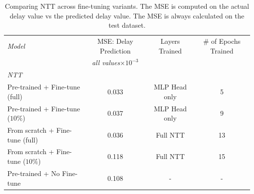 \begin{table}[htbp]
\centering
\begin{tabular}{ l   c   c  c }
\toprule
\emph{Model} &  MSE: Delay Prediction    & Layers Trained  & 	\# of Epochs Trained\\
			&		\emph{all values$\times10^{-3}$} 	&   	& \\ 
			

\midrule
\em{NTT}                                                               &                                             &   &  \\
    \smallindent Pre-trained  +   Fine-tune (full)                                  & 0.033                             & MLP Head only        & 5\\
    \smallindent Pre-trained  +   Fine-tune ($10\%$)                                  & 0.037                             & MLP Head only         & 9\\
    \smallindent From scratch  + Fine-tune (full)                                       & 0.036                             & Full NTT     & 13\\
     \smallindent From scratch  + Fine-tune ($10\%$)                                    & 0.118                             & Full NTT      &  15 \\
     \smallindent Pre-trained  +   No Fine-tune                                  & 0.108                             & -          & -\\
 
 \bottomrule

\end{tabular}
\caption{Comparing NTT across fine-tuning variants. The MSE is computed on the actual delay value vs the predicted delay value. The MSE is always calculated on the test dataset.}
\label{eval:table3}
\end{table}

